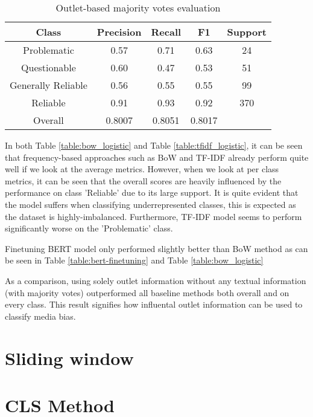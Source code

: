 \begin{table}[!h]
    \centering
    \begin{minipage}[t]{\linewidth}
        \centering
        \begin{tabular}{|| c | c | c | c | c ||}
            \hline
            Class              & Precision & Recall & F1     & Support \\
            \hline
            \hline
            Problematic        & 0.57      & 0.71   & 0.63   & 24      \\
            \hline
            Questionable       & 0.60      & 0.47   & 0.53   & 51      \\
            \hline
            Generally Reliable & 0.56      & 0.55   & 0.55   & 99      \\
            \hline
            Reliable           & 0.91      & 0.93   & 0.92   & 370     \\
            \hline
            Overall            & 0.8007    & 0.8051 & 0.8017 &         \\
            \hline
        \end{tabular}
        \caption{Outlet-based majority votes evaluation}
        \label{table:majority-votes}
    \end{minipage}
\end{table}


In both Table \ref{table:bow_logistic} and Table \ref{table:tfidf_logistic}, it can be seen that frequency-based approaches such as BoW and TF-IDF already perform quite well if we look at the average metrics. However, when we look at per class metrics, it can be seen that the overall scores are heavily influenced by the performance on class 'Reliable' due to its large support. It is quite evident that the model suffers when classifying underrepresented classes, this is expected as the dataset is highly-imbalanced. Furthermore, TF-IDF model seems to perform significantly worse on the 'Problematic' class.

Finetuning BERT model only performed slightly better than BoW method as can be seen in Table \ref{table:bert-finetuning} and Table \ref{table:bow_logistic}

As a comparison, using solely outlet information without any textual information (with majority votes) outperformed all baseline methods both overall and on every class. This result signifies how influental outlet information can be used to classify media bias.

\begin{comment}
Find out why TF-IDF performs worse on class problematic
\end{comment}

\section{Sliding window}

\section{CLS Method}

